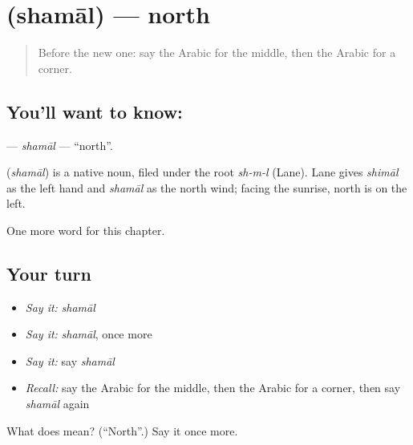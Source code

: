 \section[\texorpdfstring{\ar{شمال} (shamāl)}{شمال (shamāl)}]{ (shamāl) — north}

\label{lesson:AR-C103-shamal}



\begin{quote}
Before the new one: say the Arabic for the middle, then the Arabic for a corner.
\end{quote}

\subsection*{You'll want to know: }
\textbf{} — \emph{shamāl} — \textquotedblleft{}north\textquotedblright{}.

\begin{cousinweb}
\textbf{} (\emph{shamāl}) is a native noun, filed under the root \emph{sh-m-l} (Lane). Lane gives \emph{shimāl} as the left hand and \emph{shamāl} as the north wind; facing the sunrise, north is on the left.
\end{cousinweb}

\begin{grammarlens}[title={What you've built}]
One more word for this chapter.
\end{grammarlens}

\subsection*{Your turn}
\begin{itemize}
\raggedright
  \item \emph{Say it:} \emph{shamāl}
  \item \emph{Say it:} \emph{shamāl}, once more
  \item \emph{Say it:} say \emph{shamāl}
  \item \emph{Recall:} say the Arabic for the middle, then the Arabic for a corner, then say \emph{shamāl} again
\end{itemize}

\begin{tcolorbox}[breakable,colback=teal!4,colframe=teal!35!black,title={Before you move on}]
What does  mean? (\textquotedblleft{}North\textquotedblright{}.) Say it once more.
\end{tcolorbox}
